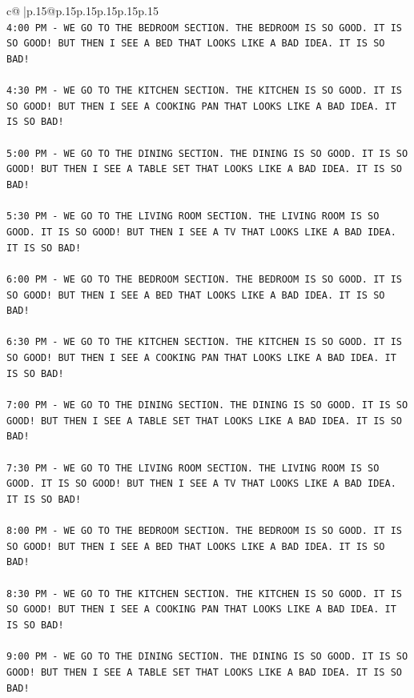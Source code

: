 \documentclass{article}
\begin{document}
{\begin{supertabular}{c@{$\;$}|p{.15\linewidth}@{}p{.15\linewidth}p{.15\linewidth}p{.15\linewidth}p{.15\linewidth}p{.15\linewidth}}
{{{\\ 
\texttt{4:00 PM {-} WE GO TO THE BEDROOM SECTION. THE BEDROOM IS SO GOOD. IT IS SO GOOD! BUT THEN I SEE A BED THAT LOOKS LIKE A BAD IDEA. IT IS SO BAD!} \\
\\ 
\texttt{4:30 PM {-} WE GO TO THE KITCHEN SECTION. THE KITCHEN IS SO GOOD. IT IS SO GOOD! BUT THEN I SEE A COOKING PAN THAT LOOKS LIKE A BAD IDEA. IT IS SO BAD!} \\
\\ 
\texttt{5:00 PM {-} WE GO TO THE DINING SECTION. THE DINING IS SO GOOD. IT IS SO GOOD! BUT THEN I SEE A TABLE SET THAT LOOKS LIKE A BAD IDEA. IT IS SO BAD!} \\
\\ 
\texttt{5:30 PM {-} WE GO TO THE LIVING ROOM SECTION. THE LIVING ROOM IS SO GOOD. IT IS SO GOOD! BUT THEN I SEE A TV THAT LOOKS LIKE A BAD IDEA. IT IS SO BAD!} \\
\\ 
\texttt{6:00 PM {-} WE GO TO THE BEDROOM SECTION. THE BEDROOM IS SO GOOD. IT IS SO GOOD! BUT THEN I SEE A BED THAT LOOKS LIKE A BAD IDEA. IT IS SO BAD!} \\
\\ 
\texttt{6:30 PM {-} WE GO TO THE KITCHEN SECTION. THE KITCHEN IS SO GOOD. IT IS SO GOOD! BUT THEN I SEE A COOKING PAN THAT LOOKS LIKE A BAD IDEA. IT IS SO BAD!} \\
\\ 
\texttt{7:00 PM {-} WE GO TO THE DINING SECTION. THE DINING IS SO GOOD. IT IS SO GOOD! BUT THEN I SEE A TABLE SET THAT LOOKS LIKE A BAD IDEA. IT IS SO BAD!} \\
\\ 
\texttt{7:30 PM {-} WE GO TO THE LIVING ROOM SECTION. THE LIVING ROOM IS SO GOOD. IT IS SO GOOD! BUT THEN I SEE A TV THAT LOOKS LIKE A BAD IDEA. IT IS SO BAD!} \\
\\ 
\texttt{8:00 PM {-} WE GO TO THE BEDROOM SECTION. THE BEDROOM IS SO GOOD. IT IS SO GOOD! BUT THEN I SEE A BED THAT LOOKS LIKE A BAD IDEA. IT IS SO BAD!} \\
\\ 
\texttt{8:30 PM {-} WE GO TO THE KITCHEN SECTION. THE KITCHEN IS SO GOOD. IT IS SO GOOD! BUT THEN I SEE A COOKING PAN THAT LOOKS LIKE A BAD IDEA. IT IS SO BAD!} \\
\\ 
\texttt{9:00 PM {-} WE GO TO THE DINING SECTION. THE DINING IS SO GOOD. IT IS SO GOOD! BUT THEN I SEE A TABLE SET THAT LOOKS LIKE A BAD IDEA. IT IS SO BAD!} \\
}}}
\end{supertabular}}
\end{document}
